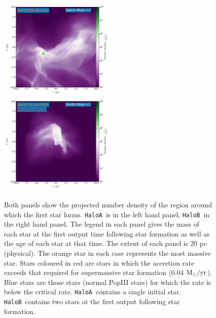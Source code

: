 \documentclass[graphics, twocolumn, usenatbib]{mn2e}
\newcommand{\msolaryrc} {$\rm{M_{\odot}/yr}$}
\newcommand{\ha} {\texttt{HaloA~}}
\newcommand{\hb} {\texttt{HaloB~}}
\begin{document}
\begin{figure} 
\centering
\begin{minipage}{175mm}      \begin{center} 
\centerline{
\includegraphics[width=0.52\textwidth]{FIGURES/HaloA/Proj_z_number_density_0001.png}
\includegraphics[width=0.52\textwidth]{FIGURES/HaloB/Proj_z_number_density_0028.png}}
\caption{Both panels show the projected number density of the region around which the first
  star forms. \ha is in the left hand panel, \hb in the right hand panel.
  The legend in each panel gives the mass of each star at the first output time following star
  formation as well as the age of each star at that time. The extent of each panel is 20 pc (physical). The orange
  star in each case represents the most massive star. Stars coloured in red are stars in which the accretion rate
  exceeds that required for supermassive star formation (0.04 \msolaryrc). Blue stars are those stars (normal PopIII stars) for
  which the rate is below the critical rate. \ha contains a single initial star. \hb contains two stars
  at the first output following star formation.  }\label{Fig:ProjectionStart}
\end{center} \end{minipage}

\end{figure}
\end{document}
